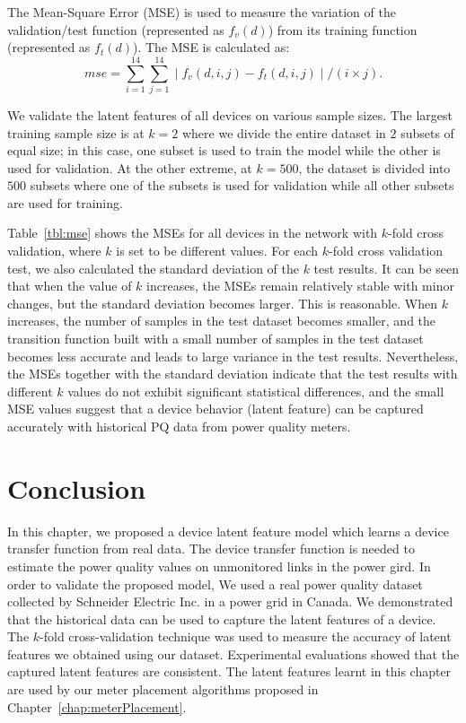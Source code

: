 The Mean-Square Error (MSE) is used to measure the variation of the validation/test function (represented as $f_v(d)$) from its training function (represented as $f_t(d)$).  The MSE is calculated as: \[mse = \sum_{i=1}^{14} \sum_{j=1}^{14} \mid f_v(d, i, j) - f_t(d, i, j) \mid / (i \times j).\]

We validate the latent features of all devices on various sample sizes. The largest training sample size is at $k=2$ where we divide the entire dataset in $2$ subsets of equal size; in this case, one subset is used to train the model while the other is used for validation. At the other extreme, at $k=500$, the dataset is divided into $500$ subsets where one of the subsets is used for validation while all other subsets are used for training.

Table~\ref{tbl:mse} shows the MSEs for all devices in the network with $k$-fold cross validation, where $k$ is set to be different values. For each $k$-fold cross validation test, we also calculated the standard deviation of the $k$ test results. It can be seen that when the value of $k$ increases, the MSEs remain relatively stable with minor changes, but the standard deviation becomes larger. This is reasonable. When $k$ increases, the number of samples in the test dataset becomes smaller, and the transition function built with a small number of samples in the test dataset becomes less accurate and leads to large variance in the test results. Nevertheless, the MSEs together with the standard deviation indicate that the test results with different $k$ values do not exhibit significant statistical differences, and the small MSE values suggest that a device behavior (latent feature) can be captured accurately with historical PQ data from power quality meters.

\section{Conclusion}
In this chapter, we proposed a device latent feature model which learns a device transfer function from real data. The device transfer function is needed to estimate the power quality values on unmonitored links in the power gird. In order to validate the proposed model, We used a real power quality dataset collected by Schneider Electric Inc. in a power grid in Canada. We demonstrated that the historical data can be used to capture the latent features of a device. The $k$-fold cross-validation technique was used to measure the accuracy of latent features we obtained using our dataset. Experimental evaluations showed that the captured latent features are consistent. The latent features learnt in this chapter are used by our meter placement algorithms proposed in Chapter~\ref{chap:meterPlacement}.